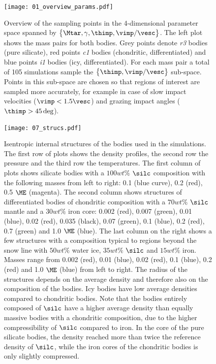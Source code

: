 \begin{figure}
\begin{center}
\texttt{[image: 01\_overview\_params.pdf]}
\caption{Overview of the sampling points in the 4-dimensional parameter space spanned by $\big\{ \Mtar, \gamma, \thimp, \vimp / \vesc \big\}$. The left plot shows the mass pairs for both bodies. Grey points denote \emph{r3} bodies (pure silicate), red points \emph{c1} bodies (chondritic, differentiated) and blue points \emph{i1} bodies (icy, differentiated). For each mass pair a total of 105 simulations sample the $\big\{ \thimp, \vimp / \vesc \big\}$ sub-space. Points in this sub-space are chosen so that regions of interest are sampled more accurately, for example in case of slow impact velocities ($\vimp < 1.5 \vesc$) and grazing impact angles ($\thimp > 45 \deg$).}
\label{ch03_fig01}
\end{center}
\end{figure}
\begin{figure}
\begin{center}
\texttt{[image: 07\_strucs.pdf]}
\caption{Isentropic internal structures of the bodies used in the simulations. The first row of plots shows the density profiles, the second row the pressure and the third row the temperatures. The first column of plots shows silicate bodies with a $100 wt\%$ $\silc$ composition with the following masses from left to right: 0.1 (blue curve), 0.2 (red), 0.5 $\ME$ (magenta). The second column shows structures of differentiated bodies of chondritic composition with a $70 wt\%$ $\silc$ mantle and a $30 wt\%$ iron core: 0.002 (red), 0.007 (green), 0.01 (blue), 0.02 (red), 0.035 (black), 0.07 (green), 0.1 (blue), 0.2 (red), 0.7 (green) and 1.0 $\ME$ (blue). The last column on the right shows a few structures with a composition typical to regions beyond the snow line with $50 wt\%$ water ice, $35 wt\%$ $\silc$ and $15 wt\%$ iron. Masses range from 0.002 (red), 0.01 (blue), 0.02 (red), 0.1 (blue), 0.2 (red) and 1.0 $\ME$ (blue) from left to right. The radius of the structures depends on the average density and therefore also on the composition of the bodies. Icy bodies have low average densities compared to chondritic bodies. Note that the bodies entirely composed of $\silc$ have a higher average density than equally massive bodies with a chondritic composition, due to the higher compressibility of $\silc$ compared to iron. In the core of the pure silicate bodies, the density reached more than twice the reference density of $\silc$, while the iron cores of the chondritic bodies is only slightly compressed.}
\label{ch03_fig07}
\end{center}
\end{figure}

